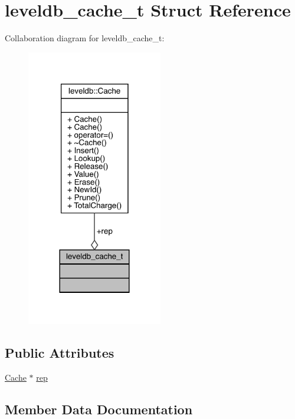 \hypertarget{structleveldb__cache__t}{}\section{leveldb\+\_\+cache\+\_\+t Struct Reference}
\label{structleveldb__cache__t}


Collaboration diagram for leveldb\+\_\+cache\+\_\+t\+:
\nopagebreak
\begin{figure}[H]
\begin{center}
\leavevmode
\includegraphics[width=168pt]{structleveldb__cache__t__coll__graph}
\end{center}
\end{figure}
\subsection*{Public Attributes}
\begin{DoxyCompactItemize}
\item 
\mbox{\hyperlink{classleveldb_1_1_cache}{Cache}} $\ast$ \mbox{\hyperlink{structleveldb__cache__t_a78f74e9a86ea86296e562fe990751a4a}{rep}}
\end{DoxyCompactItemize}


\subsection{Member Data Documentation}
\mbox{\label{structleveldb__cache__t_a78f74e9a86ea86296e562fe990751a4a}} 
